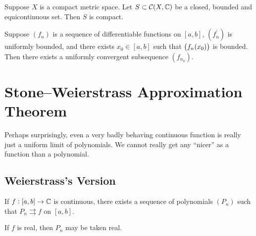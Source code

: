 \begin{corollary}
Suppose $X$ is a compact metric space. Let $S\subset\mathcal{C}(X,\mathbb C)$ be a closed, bounded and equicontinuous set. Then $S$ is compact.
\end{corollary}

\begin{corollary}
Suppose $(f_n)$ is a sequence of differentiable functions on $[a,b]$, $(f_n^\prime)$ is uniformly bounded, and there exists $x_0\in[a,b]$ such that $\left(f_n(x_0)\right)$ is bounded. Then there exists a uniformly convergent subsequence $(f_{n_k})$.
\end{corollary}
\pagebreak

\section{Stone--Weierstrass Approximation Theorem}
Perhaps surprisingly, even a very badly behaving continuous function is really just a uniform limit of polynomials. We cannot really get any ``nicer'' as a function than a polynomial.

\subsection{Weierstrass's Version}
\begin{theorem}
If $f:[a,b]\to\mathbb C$ is continuous, there exists a sequence of polynomials $(P_n)$ such that $P_n\rightrightarrows f$ on $[a,b]$.

If $f$ is real, then $P_n$ may be taken real.
\end{theorem}

